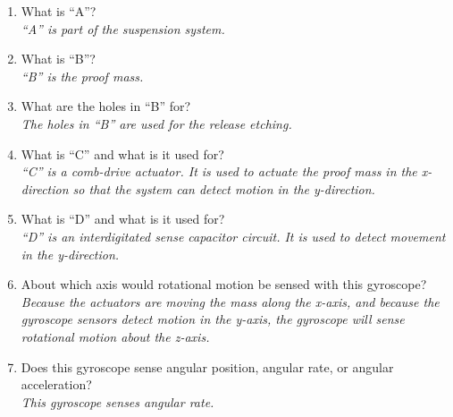 \documentclass{article}
\begin{document}
\begin{multicols}{2}
\begin{enumerate}
\item\label{p1}
What is ``A''?\\
\emph{
``A'' is part of the suspension system. 
}
	
\item\label{p2}
What is ``B''?\\
\emph{
``B'' is the proof mass.
}
  
\item\label{p3}
What are the holes in ``B'' for?\\	
\emph{
The holes in ``B'' are used for the release etching. 
}

\item\label{p4}
What is ``C'' and what is it used for?\\
\emph{
``C'' is a comb-drive actuator. It is used to actuate the proof
mass in the x-direction so that the system can detect motion in 
the y-direction.
}

\item\label{p5}
What is ``D'' and what is it used for?\\
\emph{
``D'' is an interdigitated sense capacitor circuit. It is used 
to detect movement in the y-direction.}

\item\label{p6}
About which axis would rotational motion be sensed with this 
gyroscope?\\
\emph{
Because the actuators are moving the mass along the x-axis, 
and because the gyroscope sensors detect motion in the y-axis, 
the gyroscope will sense  rotational motion about the 
z-axis. 
}

\item\label{p7}
Does this gyroscope sense angular position, angular rate, or 
angular acceleration?\\
\emph{
This gyroscope senses angular rate. 
}


\end{enumerate}
\end{multicols}
\end{document}
